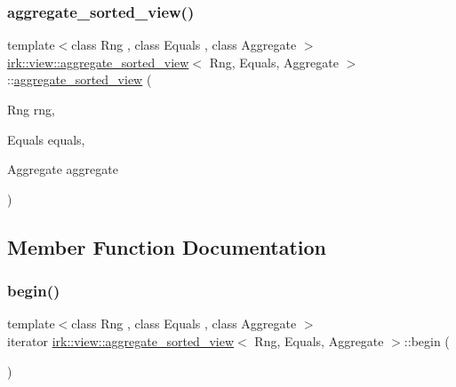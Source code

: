 \subsubsection{\texorpdfstring{aggregate\+\_\+sorted\+\_\+view()}{aggregate\_sorted\_view()}}
{\footnotesize\ttfamily template$<$class Rng , class Equals , class Aggregate $>$ \\
\mbox{\hyperlink{classirk_1_1view_1_1aggregate__sorted__view}{irk\+::view\+::aggregate\+\_\+sorted\+\_\+view}}$<$ Rng, Equals, Aggregate $>$\+::\mbox{\hyperlink{classirk_1_1view_1_1aggregate__sorted__view}{aggregate\+\_\+sorted\+\_\+view}} (\begin{DoxyParamCaption}\item[{Rng}]{rng,  }\item[{Equals}]{equals,  }\item[{Aggregate}]{aggregate }\end{DoxyParamCaption})\hspace{0.3cm}{\ttfamily [inline]}}



\subsection{Member Function Documentation}
\mbox{\label{classirk_1_1view_1_1aggregate__sorted__view_af3bf35b32e950446e57c20368ee36f8a}} 
\subsubsection{\texorpdfstring{begin()}{begin()}}
{\footnotesize\ttfamily template$<$class Rng , class Equals , class Aggregate $>$ \\
iterator \mbox{\hyperlink{classirk_1_1view_1_1aggregate__sorted__view}{irk\+::view\+::aggregate\+\_\+sorted\+\_\+view}}$<$ Rng, Equals, Aggregate $>$\+::begin (\begin{DoxyParamCaption}{ }\end{DoxyParamCaption})\hspace{0.3cm}{\ttfamily [inline]}}

\mbox{\label{classirk_1_1view_1_1aggregate__sorted__view_ae4e1532ad4e90508404311f47c6de00f}} 
